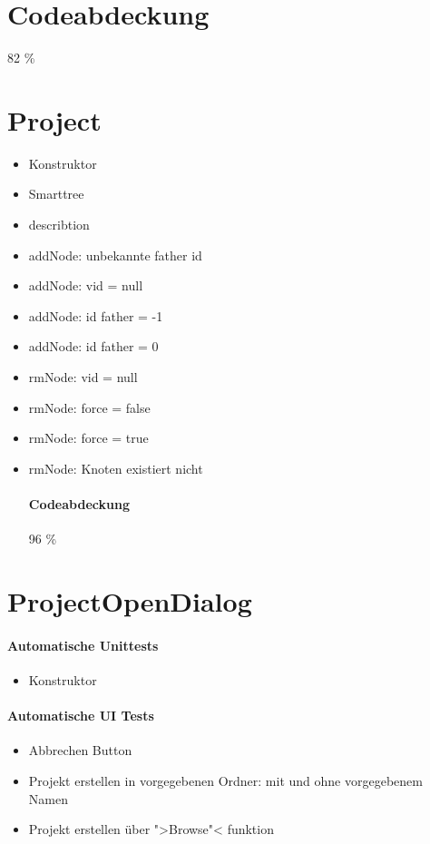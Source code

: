 \section{Codeabdeckung}
82 \%
\section{Project}
\begin{itemize}
\paragraph{Automatische Unittests}
\item Konstruktor
\item Smarttree
\item describtion
\item addNode: unbekannte father id
\item addNode: vid = null
\item addNode: id father = -1
\item addNode: id father = 0
\item rmNode: vid = null
\item rmNode: force = false
\item rmNode: force = true
\item rmNode: Knoten existiert nicht
\paragraph{Codeabdeckung}
96 \%
\end{itemize}
\section{ProjectOpenDialog}
\paragraph{Automatische Unittests}
\begin{itemize}
\item Konstruktor
\end{itemize}
\paragraph{Automatische UI Tests}
\begin{itemize}
\item Abbrechen Button
\item Projekt erstellen in vorgegebenen Ordner: mit und ohne vorgegebenem Namen
\item Projekt erstellen über ">Browse"< funktion
\end{itemize}
